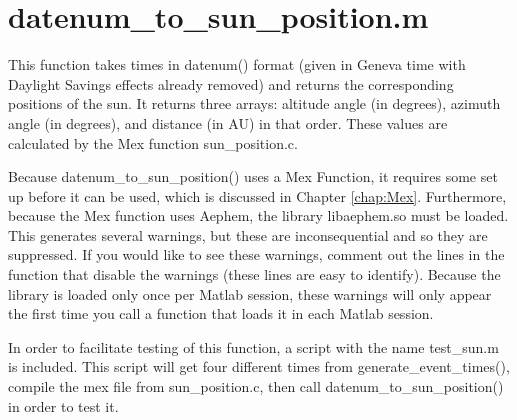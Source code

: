 \documentclass[12pt]{report}
\begin{document}
\section{datenum\_to\_sun\_position.m}
This function takes times in datenum() format (given in Geneva time with Daylight Savings effects already removed) and returns the corresponding positions of the sun.  It returns three arrays: altitude angle (in degrees), azimuth angle (in degrees), and distance (in AU) in that order.  These values are calculated by the Mex function sun\_position.c.  

Because datenum\_to\_sun\_position() uses a Mex Function, it requires some set up before it can be used, which is discussed in Chapter \ref{chap:Mex}.  Furthermore, because the Mex function uses Aephem, the library libaephem.so must be loaded.  This generates several warnings, but these are inconsequential and so they are suppressed.  If you would like to see these warnings, comment out the lines in the function that disable the warnings (these lines are easy to identify).  Because the library is loaded only once per Matlab session, these warnings will only appear the first time you call a function that loads it in each Matlab session.

In order to facilitate testing of this function, a script with the name test\_sun.m is included.  This script will get four different times from generate\_event\_times(), compile the mex file from sun\_position.c, then call datenum\_to\_sun\_position() in order to test it.
\end{document}

